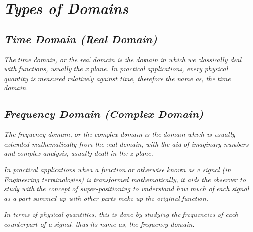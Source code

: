 

\section{\textit{Types of Domains}}
	
	\subsection{\textit{Time Domain (Real Domain)}}
	
		\textit{The time domain, or the real domain is the domain in which we classically deal with functions, usually the x plane. In practical applications, every physical quantity is measured relatively against time, therefore the name as, the time domain.}	
	
	\subsection{\textit{Frequency Domain (Complex Domain)}}

		\textit{The frequency domain, or the complex domain is the domain which is usually extended mathematically from the real domain, with the aid of imaginary numbers and complex analysis, usually dealt in the z plane.}	

		\textit{In practical applications when a function or otherwise known as a signal (in Engineering terminologies) is transformed mathematically, it aids the observer to study with the concept of super-positioning to understand how much of each signal as a part summed up with other parts make up the original function.}

		\textit{In terms of physical quantities, this is done by studying the frequencies of each counterpart of a signal, thus its name as, the frequency domain.}


